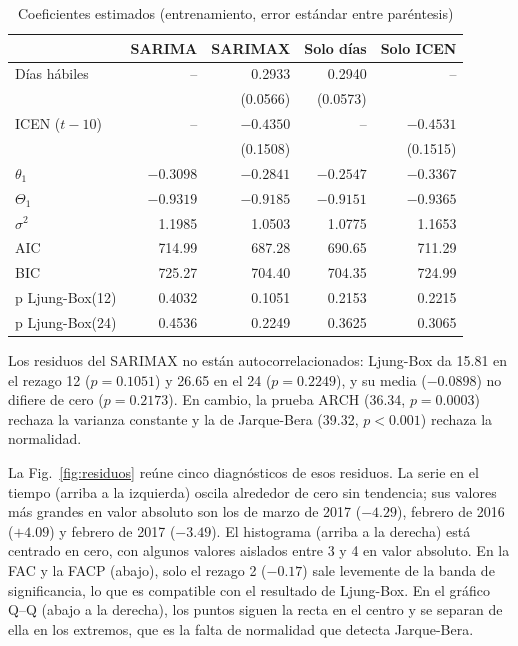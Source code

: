 \documentclass[conference]{IEEEtran}
\begin{document}
\begin{table}[!htbp]
\centering
\caption{Coeficientes estimados (entrenamiento, error estándar entre paréntesis)}
\label{tab:coeficientes}
\scriptsize
\setlength{\tabcolsep}{2.5pt}
\begin{tabularx}{\columnwidth}{@{}Xrrrr@{}}
\toprule
 & \textbf{SARIMA} & \textbf{SARIMAX} & \textbf{Solo días} & \textbf{Solo ICEN} \\
\midrule
Días hábiles & -- & 0.2933 & 0.2940 & -- \\
 & & (0.0566) & (0.0573) & \\
ICEN ($t-10$) & -- & $-0.4350$ & -- & $-0.4531$ \\
 & & (0.1508) & & (0.1515) \\
$\theta_1$ & $-0.3098$ & $-0.2841$ & $-0.2547$ & $-0.3367$ \\
$\Theta_1$ & $-0.9319$ & $-0.9185$ & $-0.9151$ & $-0.9365$ \\
$\sigma^2$ & 1.1985 & 1.0503 & 1.0775 & 1.1653 \\
\midrule
AIC & 714.99 & 687.28 & 690.65 & 711.29 \\
BIC & 725.27 & 704.40 & 704.35 & 724.99 \\
p Ljung-Box(12) & 0.4032 & 0.1051 & 0.2153 & 0.2215 \\
p Ljung-Box(24) & 0.4536 & 0.2249 & 0.3625 & 0.3065 \\
\bottomrule
\end{tabularx}
\end{table}

Los residuos del SARIMAX no están autocorrelacionados: Ljung-Box da 15.81 en el rezago 12 ($p=0.1051$) y 26.65 en el 24 ($p=0.2249$), y su media ($-0.0898$) no difiere de cero ($p=0.2173$). En cambio, la prueba ARCH (36.34, $p=0.0003$) rechaza la varianza constante y la de Jarque-Bera (39.32, $p<0.001$) rechaza la normalidad.

La Fig.~\ref{fig:residuos} reúne cinco diagnósticos de esos residuos. La serie en el tiempo (arriba a la izquierda) oscila alrededor de cero sin tendencia; sus valores más grandes en valor absoluto son los de marzo de 2017 ($-4.29$), febrero de 2016 ($+4.09$) y febrero de 2017 ($-3.49$). El histograma (arriba a la derecha) está centrado en cero, con algunos valores aislados entre 3 y 4 en valor absoluto. En la FAC y la FACP (abajo), solo el rezago 2 ($-0.17$) sale levemente de la banda de significancia, lo que es compatible con el resultado de Ljung-Box. En el gráfico Q--Q (abajo a la derecha), los puntos siguen la recta en el centro y se separan de ella en los extremos, que es la falta de normalidad que detecta Jarque-Bera.
\end{document}
